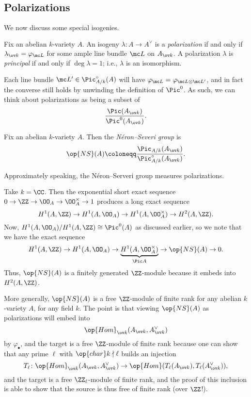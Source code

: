 \documentclass[../notes.tex]{subfiles}
\begin{document}
\subsection{Polarizations}
We now discuss some special isogenies.
\begin{definition}[polarization]
	Fix an abelian $k$-variety $A$. An isogeny $\lambda\colon A\to A^\lor$ is a \textit{polarization} if and only if $\lambda_{\ov k}=\varphi_{\mc L}$ for some ample line bundle $\mc L$ on $A_{\ov k}$. A polarization $\lambda$ is \textit{principal} if and only if $\deg\lambda=1$; i.e., $\lambda$ is an isomorphism.
\end{definition}
\begin{remark}
	Each line bundle $\mc L'\in\Pic^\circ_{A/k}(A)$ will have $\varphi_{\mc L}=\varphi_{\mc L\otimes\mc L'}$, and in fact the converse still holds by unwinding the definition of $\Pic^0$. As such, we can think about polarizations as being a subset of
	\[\frac{\Pic(A_{\ov k})}{\Pic^0(A_{\ov k})}.\]
\end{remark}
\begin{definition}
	Fix an abelian $k$-variety $A$. Then the \textit{N\'eron--Severi group} is
	\[\op{NS}(A)\coloneqq\frac{\Pic_{A/k}(A_{\ov k})}{\Pic_{A/k}^\circ(A_{\ov k})}.\]
\end{definition}
Approximately speaking, the N\'eron--Serveri group measures polarizations.
\begin{remark}
	Take $k=\CC$. Then the exponential short exact sequence $0\to\ZZ\to\OO_A\to\OO_A^\times\to1$ produces a long exact sequence
	\[H^1(A,\ZZ)\to H^1(A,\OO_A)\to H^1(A,\OO_A^\times)\to H^2(A,\ZZ).\]
	Now, $H^1(A,\OO_A)/H^1(A,\ZZ)\cong\Pic^0(A)$ as discussed earlier, so we note that we have the exact sequence
	\[H^1(A,\ZZ)\to H^1(A,\OO_A)\to\underbrace{H^1(A,\OO_A^\times)}_{\Pic A}\to\op{NS}(A)\to0.\]
	Thus, $\op{NS}(A)$ is a finitely generated $\ZZ$-module because it embeds into $H^2(A,\ZZ)$.
\end{remark}
\begin{remark}
	More generally, $\op{NS}(A)$ is a free $\ZZ$-module of finite rank for any abelian $k$-variety $A$, for any field $k$. The point is that viewing $\op{NS}(A)$ as polarizations will embed into
	\[\op{Hom}_{\ov k}(A_{\ov k},A^\lor_{\ov k})\]
	by $\varphi_\bullet$, and the target is a free $\ZZ$-module of finite rank because one can show that any prime $\ell$ with $\op{char}k\nmid\ell$ builds an injection
	\[T_\ell\colon\op{Hom}_{\ov k}(A_{\ov k},A^\lor_{\ov k})\to\op{Hom}(T_\ell(A_{\ov k}),T_\ell(A^\lor_{\ov k})),\]
	and the target is a free $\ZZ_\ell$-module of finite rank, and the proof of this inclusion is able to show that the source is thus free of finite rank (over $\ZZ$!).
\end{remark}
\end{document}
